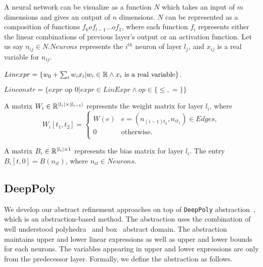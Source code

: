A neural network can be visualize as a function $N$ which takes an input of $m$ dimensions and gives an 
output of $n$ dimensions. $N$ can be represented as a composition of functions $f_k o f_{l-1} ... o f_1$,
where each function $f_i$ represents either the linear combinations of previous layer's
output or an activation function. Let us say $n_{ij} \in N.Neurons$ represents 
the $i^{th}$ neuron of layer $l_j$, and $x_{ij}$ is a real variable for $n_{ij}$. 



\begin{df}
    \label{def:linexpr}
    $Linexpr = \{ w_0 + \sum_{i} w_i x_i | w_i \in \mathbb{R} \land x_i \text{ is a real variable} \}$.
\end{df}
  
\begin{df}
    \label{def:linconstr}
    $Linconstr = \{expr \text{ op } 0 | expr \in LinExpr \land op \in \{\leq, = \}\}$
\end{df}






\begin{df}
  A matrix $W_i \in \mathbb{R}^{|l_i|\times|l_{i-1}|}$ represents the weight matrix for layer $l_i$, where  
    $$
    W_i[t_1, t_2] = 
    \begin{cases}
      W(e) & e=(n_{(i-1)t_2}, n_{it_1}) \in Edges,\\
      0 & \text{otherwise.}\\
    \end{cases}
    $$
\end{df}

\begin{df}
    A matrix $B_i \in \mathbb{R}^{|l_i|\times 1}$ represents the bias matrix for layer $l_i$. The entry $B_i[t,0] = B(n_{it})$, where $n_{it} \in Neurons$. 
\end{df}



\subsection{DeepPoly}
\label{sec:deeppoly}
We develop our abstract refinement approaches on top of \texttt{DeepPoly}
abstraction~\cite{deeppoly}, which is an abstraction-based method.
The abstraction uses the combination of
well understood polyhedra~\cite{polyhedra} and box~\cite{boxd} abstract domain.
The abstraction maintains
upper and lower linear expressions
as well as
upper and lower bounds for each neurons.
The variables appearing in upper and lower expressions are only from
the predecessor layer.
Formally, we define the abstraction as follows. 

